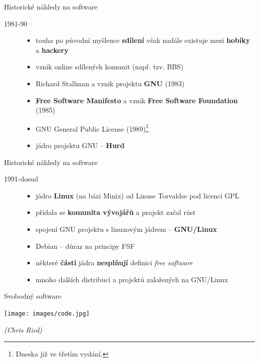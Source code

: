 \documentclass[11pt]{beamer}
\begin{document}
	\begin{frame}{Historické náhledy na software}
	\begin{description}
		\item[1981-90]
		\begin{itemize}
			\item touha po původní myšlence \textbf{sdílení} však nadále existuje mezi \textbf{hobíky} a \textbf{hackery}
			\item vznik online sdílených komunit (např. tzv. BBS)
			\item Richard Stallman a vznik projektu \textbf{GNU} (1983)
			\item \textbf{Free Software Manifesto} a vznik \textbf{Free Software Foundation} (1985)
			\item GNU General Public License (1989)\footnote{Dneska již ve třetím vydání.}
			\item jádro projektu GNU -- \textbf{Hurd}
		\end{itemize}
	\end{description}
\end{frame}

	\begin{frame}{Historické náhledy na software}
	\begin{description}
		\item[1991-dosud]
		\begin{itemize}
			\item jádro \textbf{Linux} (na bázi Minix) od Linuse Torvaldse pod licencí GPL
			\item přidala se \textbf{komunita vývojářů} a projekt začal růst
			\item spojení GNU projektu s linuxovým jádrem -- \textbf{GNU/Linux}
			\item Debian -- důraz na principy FSF
			\item některé \textbf{části} jádra \textbf{nesplňují} definici \textit{free software}
			\item mnoho dalších distribucí a projektů založených na GNU/Linux
		\end{itemize}
	\end{description}
\end{frame}
	
	\begin{frame}{Svobodný software}
		\begin{center}
			\texttt{[image: images/code.jpg]}
		\end{center}
		\begin{flushright}
			\textit{(Chris Ried)}
		\end{flushright}
	\end{frame}
	
\end{document}
